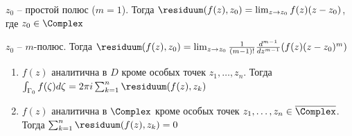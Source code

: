 \documentclass[12pt]{article}
\begin{document}
\begin{enumerate}
    \begin{MyTheorem}
        \Ths $z_0$ -- простой полюс ($m = 1$). Тогда $\residuum(f(z), z_0) = \lim_{z \to z_0} f(z) (z - z_0)$, где $z_0 \in \Complex$
    \end{MyTheorem}
    
    \begin{MyTheorem}
        \Ths $z_0$ -- $m$-полюс. Тогда $\residuum(f(z), z_0) = \lim_{z \to z_0} \frac{1}{(m - 1)!} \frac{d^{m - 1}}{dz^{m - 1}} (f(z) (z - z_0)^m)$
    \end{MyTheorem}

    \begin{MyTheorem}
    
        \begin{enumerate}
            \item $f(z)$ аналитична в $D$ кроме особых точек $z_1, \dots, z_n$. Тогда $\int_{\Gamma_0} f(\zeta) d\zeta = 2\pi i \sum_{k = 1}^n \residuum(f(z), z_k)$
    
            \item $f(z)$ аналитична в $\Complex$ кроме особых точек $z_1, \dots, z_n \in \overline{\Complex}$. Тогда $\sum_{k = 1}^n \residuum(f(z), z_k) = 0$
        \end{enumerate}
    \end{MyTheorem}

\end{enumerate}
\end{document}
